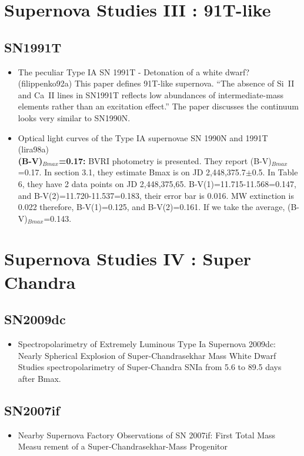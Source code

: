 \section{Supernova Studies III : 91T-like}
\subsection{\bf SN1991T}
\begin{itemize}
\item The peculiar Type IA SN 1991T - Detonation of a white dwarf? (filippenko92a)
\cite{filippenko92a}
This paper defines 91T-like supernova.  ``The absence of Si~II and Ca~II lines in SN1991T
reflects low abundances of intermediate-mass elements rather than an excitation effect.''
The paper discusses the continuum looks very similar to SN1990N.
\item Optical light curves of the Type IA supernovae SN 1990N and 1991T (lira98a)
\cite{lira98a}\\
{\bf (B-V)$_{Bmax}$=0.17:}
BVRI photometry is presented.  They report (B-V)$_{Bmax}$=0.17. In section 3.1,
they estimate Bmax is on JD 2,448,375.7$\pm$0.5.  In Table 6, they have 2 data points
on JD 2,448,375,65. B-V(1)=11.715-11.568=0.147, and B-V(2)=11.720-11.537=0.183, their
error bar is 0.016. MW extinction is 0.022 therefore, B-V(1)=0.125, and B-V(2)=0.161.
If we take the average, (B-V)$_{Bmax}$=0.143.
\end{itemize}

\section{Supernova Studies IV : Super Chandra}
\subsection{SN2009dc}
\begin{itemize}
\item Spectropolarimetry of Extremely Luminous Type Ia Supernova 2009dc:
 Nearly Spherical Explosion of Super-Chandrasekhar Mass White Dwarf
\citep{tanaka10a}\\
Studies spectropolarimetry of Super-Chandra SNIa from 5.6 to 89.5 days
after Bmax.
\end{itemize}

\subsection{SN2007if}
\begin{itemize}
\item Nearby Supernova Factory Observations of SN 2007if: First Total Mass Measu
rement of a Super-Chandrasekhar-Mass Progenitor \citep{scalzo10a}\\
\end{itemize}

